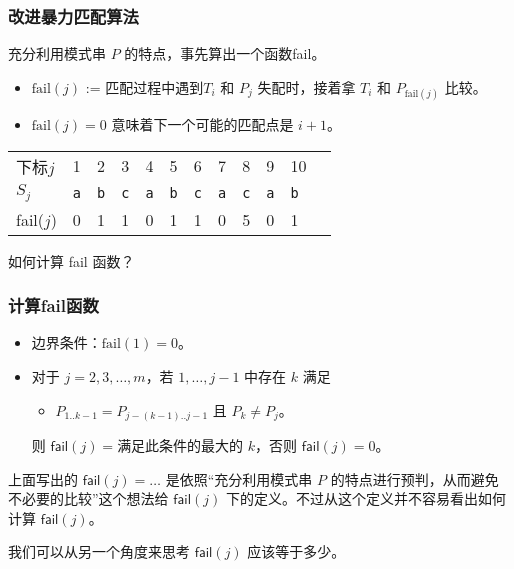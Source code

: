 \documentclass{ctexbeamer}
\newcommand{\str}[1]{\texttt{#1}}
\newcommand{\fail}{\mathsf{fail}}
\begin{document}
\begin{frame}
\frametitle{改进暴力匹配算法}
充分利用模式串 $P$ 的特点，事先算出一个函数fail。

\begin{itemize}
\item $\text{fail}(j)$ := 匹配过程中遇到$T_i$ 和 $P_j$ 失配时，接着拿 $T_i$ 和 $P_{\text{fail}(j)}$ 比较。
\item $\text{fail}(j) = 0$ 意味着下一个可能的匹配点是 $i+1$。
\end{itemize}




\begin{table}[]
\begin{tabular}{llllllllllll}
下标$j$ & 1  & 2  & 3 & 4 & 5 & 6 & 7 & 8 & 9 & 10 \\
$S_j$ & \str{a} & \str{b} & \str{c} & \str{a} & \str{b} & \str{c} & \str{a} & \str{c} & \str{a}  & \str{b} \\
fail($j$) & 0  & 1  & 1 & 0 & 1 & 1 & 0 & 5  & 0  & 1
\end{tabular}
\end{table}

\begin{block}{}
如何计算 fail 函数？
\end{block}




\end{frame}

\begin{frame}[fragile]
\frametitle{计算fail函数}


\begin{itemize}
\item 边界条件：$\text{fail}(1) = 0$。
\item 对于 $j = 2, 3, \dots, m$，若 $1, \dots, j - 1$ 中存在 $k$ 满足
{
\begin{itemize}
\item $P_{1..k - 1} = P_{j - (k - 1) .. j - 1}$ 且 $P_{k} \ne P_j$。
\end{itemize}
则 $\fail(j) = $满足此条件的最大的 $k$，否则 $\fail(j) = 0$。
}
\end{itemize}

\begin{block}{}
上面写出的 $\fail(j) =  \dots$ 是依照``充分利用模式串 $P$ 的特点进行预判，从而避免不必要的比较''这个想法给 $\fail(j)$ 下的定义。不过从这个定义并不容易看出如何计算 $\fail(j)$。
\end{block}


\begin{block}{}
我们可以从另一个角度来思考 $\fail(j)$ 应该等于多少。
\end{block}

\end{frame}
\end{document}
